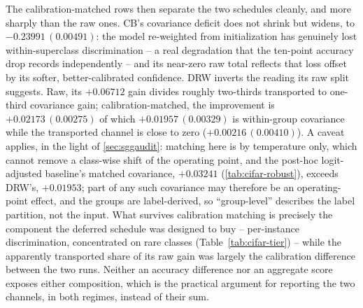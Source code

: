The calibration-matched rows then separate the two schedules cleanly, and more sharply
than the raw ones. CB's covariance deficit does not shrink but widens, to
$-0.23991\,(0.00491)$: the model re-weighted from initialization has genuinely lost
within-superclass discrimination -- a real degradation that the ten-point accuracy drop
records independently -- and its near-zero raw total reflects that loss offset by its
softer, better-calibrated confidence. DRW inverts the reading its raw split suggests.
Raw, its $+0.06712$ gain divides roughly two-thirds transported to one-third covariance gain;
calibration-matched, the improvement is $+0.02173\,(0.00275)$ of which
$+0.01957\,(0.00329)$ is within-group covariance while the transported channel is close to zero
($+0.00216\,(0.00410)$). A caveat applies, in the light of \cref{sec:sggaudit}: matching here is by
temperature only, which cannot remove a class-wise shift of the operating point, and the post-hoc
logit-adjusted baseline's matched covariance, $+0.03241$ (\cref{tab:cifar-robust}), exceeds DRW's,
$+0.01953$; part of any such covariance may therefore be an operating-point effect, and the
groups are label-derived, so ``group-level'' describes the label partition, not the input. What survives calibration matching is precisely the component
the deferred schedule was designed to buy -- per-instance discrimination, concentrated
on rare classes (Table~\ref{tab:cifar-tier}) -- while the apparently transported
share of its raw gain was largely the calibration difference between the two runs.
Neither an accuracy difference nor an aggregate score exposes either composition, which
is the practical argument for reporting the two channels, in both regimes, instead of
their sum.

